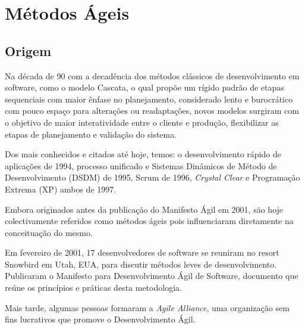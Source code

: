 \chapter{Métodos Ágeis}
\label{cap:metodosageis}
\section{Origem}
\par  Na década de 90 com a decadência dos métodos clássicos de desenvolvimento em software, como o modelo Cascata, o qual propõe um rígido padrão de etapas sequenciais com maior ênfase no planejamento, considerado lento e burocrático com pouco espaço para alterações ou readaptações, novos modelos surgiram com o objetivo de maior interatividade entre o cliente e produção, flexibilizar as etapas de planejamento e validação do sistema.
\par Dos mais conhecidos e citados até hoje, temos: o desenvolvimento rápido de aplicações de 1994, processo unificado e Sistemas Dinâmicos de Método de Desenvolvimento (DSDM) de 1995, Scrum de 1996, \emph{Crystal Clear} e Programação Extrema (XP) ambos de 1997.
\par Embora originados antes da publicação do Manifesto Ágil em 2001, são hoje colectivamente referidos como métodos ágeis pois influenciaram diretamente na conceituação do mesmo.
\par Em fevereiro de 2001, 17 desenvolvedores de software se reuniram no resort Snowbird em Utah, EUA, para discutir métodos leves de desenvolvimento. Publicaram o Manifesto para Desenvolvimento Ágil de Software, documento que reúne os princípios e práticas desta metodologia.
\par Mais tarde, algumas pessoas formaram a \emph{Agile Alliance}, uma organização sem fins lucrativos que promove o Desenvolvimento Ágil.
